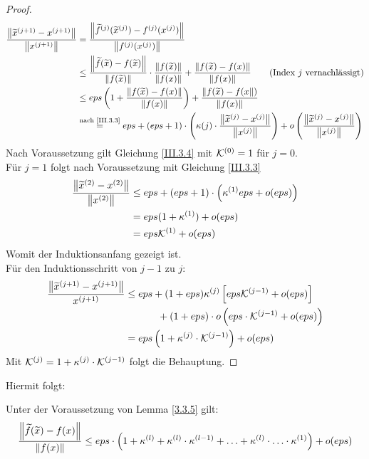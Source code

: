 \begin{proof}
  \begin{align*}
    \frac{\left\| \widetilde{x}^{(j+1)}-x^{(j+1)} \right\|}{\left\| x^{(j+1)} \right\|}
    &= \frac{\left\| \widetilde{f}^{(j)}(\widetilde{x}^{(j)})-f^{(j)}(x^{(j)}) \right\|}
      {\left\| f^{(j)}(x^{(j)}) \right\|} \\
    &\leq \frac{\left\| \widetilde{f}(\widetilde{x})-f(\widetilde{x}) \right\|}{\left\| f(\widetilde{x}) \right\|}
      \cdot \frac{\left\| f(\widetilde{x}) \right\|}{\left\| f(x) \right\|}
      + \frac{\left\| f(\widetilde{x})-f({x}) \right\|}{\left\| f(x) \right\|} 
      \quad\quad \text{(Index $j$ vernachlässigt)}\\
    &\leq eps \left( 1+ \frac{\left\| f(\widetilde{x})-f({x}) \right\|}{\left\| f(x) \right\|}\right)
      + \frac{\left\| f(\widetilde{x})-f({x} \right\|)}{\left\| f(x) \right\|}\\
    &\overset{\text{nach \ref{III.3.3}}}{=} eps + (eps+1) \cdot 						\left(\kappa{(j)}\cdot \frac{\left\| \widetilde{x}^{(j)}-x^{(j)} \right\|}{\left\| x^{(j)} \right\|}\right)
      + o\left( \frac{\left\| \widetilde{x}^{(j)}-x^{(j)} \right\|}{\left\| x^{(j)} \right\|}\right)
  \end{align*}
  Nach Voraussetzung gilt Gleichung \eqref{III.3.4}  mit $\mathcal{K}^{(0)}=1$ für $j=0$. \\
  Für $j=1$ folgt nach Voraussetzung mit Gleichung \eqref{III.3.3}
  \begin{align*}
    \frac{\left\| \widetilde{x}^{(2)}-x^{(2)} \right\|}{\left\| x^{(2)} \right\|}
    & \leq eps +(eps+1) \cdot \left( \kappa^{(1)}eps+ o(eps)\right) \\
    &= eps(1+\kappa^{(1)}) + o(eps) \\
    &= eps\mathcal{K}^{(1)} + o(eps)
  \end{align*}
  Womit der Induktionsanfang gezeigt ist. \\
  Für den Induktionsschritt von $j-1$ zu $j$:
  \begin{align*}
    \frac{\left\| \widetilde{x}^{(j+1)}-x^{(j+1)} \right\|}{x^{(j+1)}}
    & \leq eps + (1+eps)\kappa^{(j)} \left[ eps \mathcal{K}^{(j-1)}+ o(eps) \right] \\
    &\phantom{\leq eps+} + (1+eps) \cdot o\left( eps\cdot \mathcal{K}^{(j-1)} +o(eps)\right) \\
    &= eps\left(1+\kappa^{(j)}\cdot \mathcal{K}^{(j-1)}\right)+ o(eps)
  \end{align*}
  Mit $\mathcal{K}^{(j)} = 1+ \kappa^{(j)}\cdot \mathcal{K}^{(j-1)}$ folgt die Behauptung.
\end{proof}

Hiermit folgt:

\begin{Kore}
  \label{3.3.6}
  Unter der Voraussetzung von Lemma \ref{3.3.5} gilt:
  \begin{gather}
    \frac{\left\| \widetilde{f}(\widetilde{x})-f(x) \right\|}{\left\| f(x) \right\|} \leq 
    eps\cdot \left( 1+\kappa^{(l)}+ \kappa^{(l)}\cdot \kappa^{(l-1)}+ \dotsc
      + \kappa^{(l)}\cdot \dotsc \cdot \kappa^{(1)}\right) + o(eps) 
    \label{III.3.5}
  \end{gather}~
\end{Kore}

